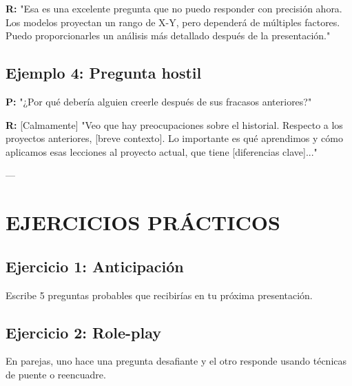\documentclass[a4paper,11pt]{article}
\begin{document}
\vspace{0.2cm}

\textbf{R:} "Esa es una excelente pregunta que no puedo responder con precisión ahora. Los modelos proyectan un rango de X-Y, pero dependerá de múltiples factores. Puedo proporcionarles un análisis más detallado después de la presentación."

\vspace{0.2cm}

\subsection{Ejemplo 4: Pregunta hostil}

\vspace{0.2cm}

\textbf{P:} "¿Por qué debería alguien creerle después de sus fracasos anteriores?"

\vspace{0.2cm}

\textbf{R:} [Calmamente] "Veo que hay preocupaciones sobre el historial. Respecto a los proyectos anteriores, [breve contexto]. Lo importante es qué aprendimos y cómo aplicamos esas lecciones al proyecto actual, que tiene [diferencias clave]..."

\vspace{0.2cm}

---

\vspace{0.2cm}

\section{EJERCICIOS PRÁCTICOS}

\vspace{0.2cm}

\subsection{Ejercicio 1: Anticipación}

Escribe 5 preguntas probables que recibirías en tu próxima presentación.

\vspace{0.2cm}

\subsection{Ejercicio 2: Role-play}

En parejas, uno hace una pregunta desafiante y el otro responde usando técnicas de puente o reencuadre.
\end{document}
